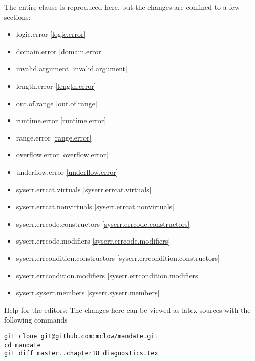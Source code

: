 The entire clause is reproduced here, but the changes are confined to a few sections:

\begin{multicols}{2}
\begin{itemize}
\item{logic.error                       \ref{logic.error}}
\item{domain.error                      \ref{domain.error}}
\item{invalid.argument                  \ref{invalid.argument}}
\item{length.error                      \ref{length.error}}
\item{out.of.range                      \ref{out.of.range}}
\item{runtime.error                     \ref{runtime.error}}
\item{range.error                       \ref{range.error}}
\item{overflow.error                    \ref{overflow.error}}
\item{underflow.error                   \ref{underflow.error}}
\item{syserr.errcat.virtuals            \ref{syserr.errcat.virtuals}}
\item{syserr.errcat.nonvirtuals         \ref{syserr.errcat.nonvirtuals}}
\item{syserr.errcode.constructors       \ref{syserr.errcode.constructors}}
\item{syserr.errcode.modifiers          \ref{syserr.errcode.modifiers}}
\item{syserr.errcondition.constructors  \ref{syserr.errcondition.constructors}}
\item{syserr.errcondition.modifiers     \ref{syserr.errcondition.modifiers}}
\item{syserr.syserr.members             \ref{syserr.syserr.members}}
\end{itemize}
\end{multicols}

\vfill
Help for the editors: The changes here can be viewed as latex sources with the following commands
\begin{verbatim}
git clone git@github.com:mclow/mandate.git
cd mandate
git diff master..chapter18 diagnostics.tex
\end{verbatim}
\newpage

